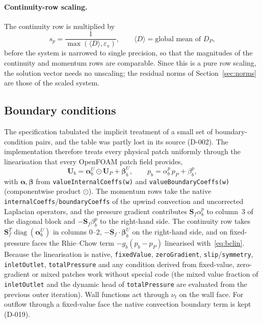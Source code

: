 \documentclass[11pt,a4paper]{article}
\newcommand{\vect}[1]{\mathbf{#1}}
\newcommand{\Uv}{\vect{U}}
\newcommand{\Sf}{\vect{S}_f}
\newcommand{\VSMALL}{\varepsilon_{\mathrm{v}}}
\newcommand{\code}[1]{\texttt{#1}}
\begin{document}
\paragraph{Continuity-row scaling.}
The continuity row is multiplied by
\begin{equation}
  s_p = \frac{1}{\max(\langle D\rangle,\VSMALL)},\qquad
  \langle D\rangle = \text{global mean of } D_P,
\end{equation}
before the system is narrowed to single precision, so that the magnitudes of
the continuity and momentum rows are comparable. Since this is a pure row
scaling, the solution vector needs no unscaling; the residual norms of
Section~\ref{sec:norms} are those of the scaled system.

\subsection{Boundary conditions}\label{sec:bc}

The specification tabulated the implicit treatment of a small set of
boundary-condition pairs, and the table was partly lost in its source
(D-002). The implementation therefore treats every physical patch uniformly
through the linearisation that every OpenFOAM patch field provides,
\begin{equation}
  \Uv_b = \vect\alpha^U_b\odot\Uv_P + \vect\beta^U_b,\qquad
  p_b = \alpha^p_b\,p_P + \beta^p_b,
  \label{eq:bclin}
\end{equation}
with $\vect\alpha,\vect\beta$ from \code{valueInternalCoeffs(w)} and
\code{valueBoundaryCoeffs(w)} (componentwise product $\odot$). The momentum
rows take the native \code{internalCoeffs}/\code{boundaryCoeffs} of the upwind
convection and uncorrected Laplacian operators, and the pressure gradient
contributes $\Sf\alpha^p_b$ to column~3 of the diagonal block and
$-\Sf\beta^p_b$ to the right-hand side. The continuity row takes
$\Sf^T\operatorname{diag}(\vect\alpha^U_b)$ in columns 0--2,
$-\Sf\cdot\vect\beta^U_b$ on the right-hand side, and on fixed-pressure faces
the Rhie--Chow term $-g_b(p_b-p_P)$ linearised with~\eqref{eq:bclin}.
Because the linearisation is native, \code{fixedValue}, \code{zeroGradient},
\code{slip}/\code{symmetry}, \code{inletOutlet}, \code{totalPressure} and any
condition derived from fixed-value, zero-gradient or mixed patches work
without special code (the mixed value fraction of \code{inletOutlet} and the
dynamic head of \code{totalPressure} are evaluated from the previous outer
iteration). Wall functions act through $\nu_t$ on the wall face. For
outflow through a fixed-value face the native convection boundary term is
kept (D-019).
\end{document}
